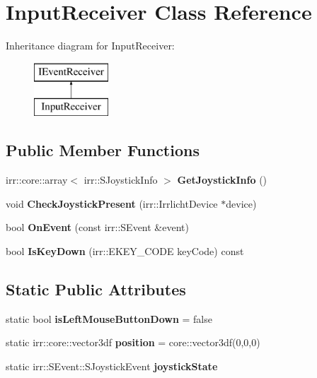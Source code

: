 \hypertarget{class_input_receiver}{}\section{Input\+Receiver Class Reference}
\label{class_input_receiver}
Inheritance diagram for Input\+Receiver\+:\begin{figure}[H]
\begin{center}
\leavevmode
\includegraphics[height=2.000000cm]{class_input_receiver}
\end{center}
\end{figure}
\subsection*{Public Member Functions}
\begin{DoxyCompactItemize}
\item 
\mbox{\label{class_input_receiver_a93d0cb79217595eb9bc29f5785bb5620}} 
irr\+::core\+::array$<$ irr\+::\+S\+Joystick\+Info $>$ {\bfseries Get\+Joystick\+Info} ()
\item 
\mbox{\label{class_input_receiver_a0f4ecd33eace7fe2778cba699a06cd82}} 
void {\bfseries Check\+Joystick\+Present} (irr\+::\+Irrlicht\+Device $\ast$device)
\item 
\mbox{\label{class_input_receiver_a8cbad01c0e0dcaa953685b1c932d8ce6}} 
bool {\bfseries On\+Event} (const irr\+::\+S\+Event \&event)
\item 
\mbox{\label{class_input_receiver_a736d040738e9826b2abbcc0dd9cd085c}} 
bool {\bfseries Is\+Key\+Down} (irr\+::\+E\+K\+E\+Y\+\_\+\+C\+O\+DE key\+Code) const
\end{DoxyCompactItemize}
\subsection*{Static Public Attributes}
\begin{DoxyCompactItemize}
\item 
\mbox{\label{class_input_receiver_a1763dd9cc9a31639592fb23115cdcc64}} 
static bool {\bfseries is\+Left\+Mouse\+Button\+Down} = false
\item 
\mbox{\label{class_input_receiver_a4bffdbd7b8b83008a8f0d79ab018bb6b}} 
static irr\+::core\+::vector3df {\bfseries position} = core\+::vector3df(0,0,0)
\item 
\mbox{\label{class_input_receiver_ad5486727fcb5faf69809b69f311c0b27}} 
static irr\+::\+S\+Event\+::\+S\+Joystick\+Event {\bfseries joystick\+State}
\end{DoxyCompactItemize}
